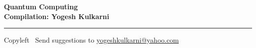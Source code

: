 
\graphicspath{{images/}}
% 
% 
% 
% 

% 
%


\footnotesize


\begin{center}
\Large{\textbf{Quantum Computing\\ Compilation: Yogesh Kulkarni}}  
\end{center}

\begin{multicols}{2}

\end{multicols}

\rule{\linewidth}{0.25pt}
\scriptsize
Copyleft \textcopyleft\  Send suggestions to 
\href{http://www.yogeshkulkarni.com}{yogeshkulkarni@yahoo.com}


